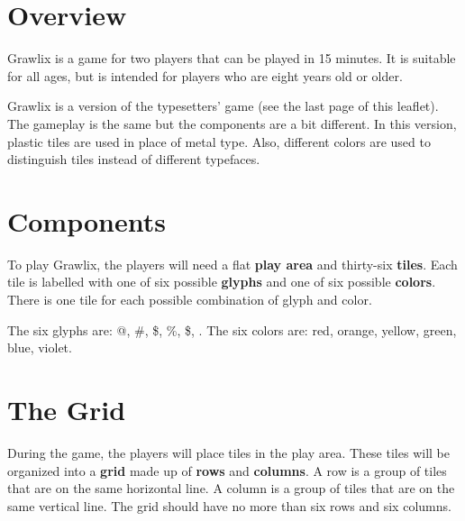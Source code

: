 \documentclass[a4paper, 10pt, notumble]{leaflet}
\makeatletter
\newcommand{\smallat}{{\setmainfont{Comic Neue-Bold} \Large @}}
\newcommand{\smallpound}{{\setmainfont{Comic Neue-Bold} \large \#}}
\newcommand{\smalldollar}{{\setmainfont{Comic Neue-Bold} \large \$}}
\newcommand{\smallpercent}{{\setmainfont{Comic Neue-Bold} \large \%}}
\newcommand{\smallampersand}{{\setmainfont{Comic Neue-Bold} \large \$}}
\newcommand{\smallasterisk}{{\setmainfont{Quicksand-Bold} \Huge \raisebox{-0.25ex}{\textasteriskcentered{}}}}
\makeatother
\begin{document}
\section{Overview}
Grawlix is a game for two players that can be played in 15  minutes. It is suitable for all ages, but is intended for players who are eight years old or older.

Grawlix is a version of the typesetters' game (see the last page of this leaflet). The gameplay is the same but the components are a bit different. In this version, plastic tiles are used in place of metal type. Also, different colors are used to distinguish tiles instead of different typefaces.

\section{Components}
To play Grawlix, the players will need a flat \textbf{play area} and thirty-six \textbf{tiles}. Each tile is labelled with one of six possible \textbf{glyphs} and one of six possible \textbf{colors}.  There is one tile for each possible combination of glyph and color.

The six glyphs are: \smallat, \smallpound, \smalldollar, \smallpercent, \smallampersand, \smallasterisk. The six colors are: red, orange, yellow, green, blue, violet.

\begin{figure}[h]
\centering
{}

\end{figure}

\newpage

\section{The Grid}
During the game, the players will place tiles in the play area. These tiles will be organized into a \textbf{grid} made up of \textbf{rows} and \textbf{columns}. A row is a group of tiles that are on the same horizontal line.  A column is a group of tiles that are on the same vertical line. The grid should have no more than six rows and six columns.
\end{document}
